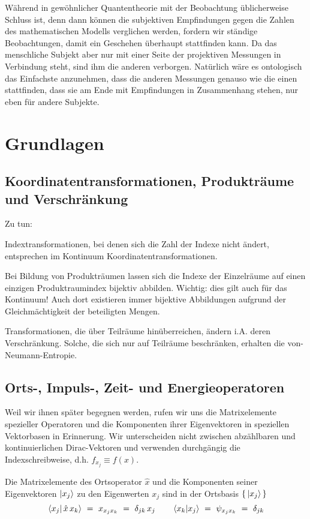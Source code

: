 \documentclass[12pt]{article}
\begin{document}
Während in gewöhnlicher Quantentheorie mit der Beobachtung üblicherweise Schluss ist, denn dann können die subjektiven Empfindungen gegen die Zahlen des mathematischen Modells verglichen werden, fordern wir ständige Beobachtungen, damit ein Geschehen überhaupt stattfinden kann. Da das menschliche Subjekt aber nur mit einer Seite der projektiven Messungen in Verbindung steht, sind ihm die anderen verborgen. Natürlich wäre es ontologisch das Einfachste anzunehmen, dass die anderen Messungen genauso wie die einen stattfinden, dass sie am Ende mit Empfindungen in Zusammenhang stehen, nur eben für andere Subjekte. 

\section{Grundlagen}

\subsection{Koordinatentransformationen, Produkträume und Verschränkung}

Zu tun: 

Indextransformationen, bei denen sich die Zahl der Indexe nicht ändert, entsprechen im Kontinuum Koordinatentransformationen. 

Bei Bildung von Produkträumen lassen sich die Indexe der Einzelräume auf einen einzigen Produktraumindex bijektiv abbilden. Wichtig: dies gilt auch für das Kontinuum! Auch dort existieren immer bijektive Abbildungen aufgrund der Gleichmächtigkeit der beteiligten Mengen.

Transformationen, die über Teilräume hinüberreichen, ändern i.A. deren Verschränkung. Solche, die sich nur auf Teilräume beschränken, erhalten die von-Neumann-Entropie.

\subsection{Orts-, Impuls-, Zeit- und Energieoperatoren}

Weil wir ihnen später begegnen werden, rufen wir uns die Matrixelemente spezieller Operatoren und die Komponenten ihrer Eigenvektoren in speziellen Vektorbasen in Erinnerung. Wir unterscheiden nicht zwischen abzählbaren und kontinuierlichen Dirac-Vektoren und verwenden durchgängig die Indexschreibweise, d.h. $f_{x_j} \equiv f(x)$.

Die Matrixelemente des Ortsoperator $\hat{x}$ und die Komponenten seiner Eigenvektoren $\ket{x_j}$ zu den Eigenwerten $x_j$ sind in der Ortsbasis $\{\,\ket{x_j}\,\}$
\begin{equation}
\bra{x_j}\ket{\,\hat{x}\,x_k}\ =\ x_{x_j x_k}\ =\ \delta_{jk}\,x_j
\quad\quad 
\bra{x_k}\ket{x_j}\ =\ \psi_{x_j x_k}\ =\ \delta_{jk}
\end{equation}
\end{document}
